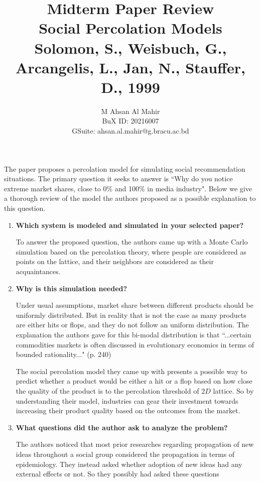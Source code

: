 \documentclass[article, 11pt, a4paper, oneside]{memoir}
\title{\vspace{-3.5em}\Large\textbf{Midterm Paper Review}\\[1em] \LARGE \textbf{Social
Percolation Models} \\ \Large Solomon, S., Weisbuch, G., Arcangelis, L., Jan, N.,
Stauffer, D., 1999}
\author{M Ahsan Al Mahir\\ \small BuX ID: 20216007\\ \small GSuite: ahsan.al.mahir@g.bracu.ac.bd}
\begin{document}
\maketitle

The paper proposes a percolation model for simulating social recommendation situations.
The primary question it seeks to answer is ``Why do you notice extreme market shares,
close to 0\% and 100\% in media industry". Below we give a thorough review of the model
the authors proposed as a possible explanation to this question.


\begin{enumerate}[left=0pt, itemsep=20pt, label={\(\square\)}]

    \item \textbf{Which system is modeled and simulated in your selected paper? }

        To answer the proposed question, the authors came up with a Monte Carlo simulation
        based on the percolation theory, where people are considered as points on the
        lattice, and their neighbors are considered as their acquaintances. 

    \item \textbf{Why is this simulation needed? }

        Under usual assumptions, market share between different products should be
        uniformly distributed. But in reality that is not the case as many products are
        either hits or flops, and they do not follow an uniform distribution. The
        explanation the authors gave for this bi-modal distribution is that ``...certain
        commodities markets is often discussed in evolutionary economics in terms of
        bounded rationality..." (p. 240)

        The social percolation model they came up with presents a possible way to predict
        whether a product would be either a hit or a flop based on how close the quality
        of the product is to the percolation threshold of \(2D\) lattice. So by
        understanding their model, industries can gear their investment towards increasing
        their product quality based on the outcomes from the market.

    \item \textbf{What questions did the author ask to analyze the problem? }

        The authors noticed that most prior researches regarding propagation of new ideas
        throughout a social group considered the propagation in terms of epidemiology.
        They instead asked whether adoption of new ideas had any external effects or not.
        So they possibly had asked these questions


\end{enumerate}
\end{document}
